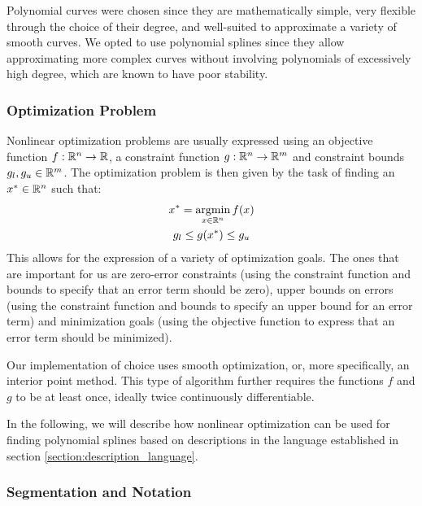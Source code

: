 \documentclass[a4paper]{article}
\begin{document}
			Polynomial curves were chosen since they are mathematically simple, very flexible through the choice of their degree, and well-suited to approximate a variety of smooth curves. We opted to use polynomial splines since they allow approximating more complex curves without involving polynomials of excessively high degree, which are known to have poor stability.

			\subsubsection{Optimization Problem}
			\label{section:optimization_problem}

				Nonlinear optimization problems are usually expressed using an objective function \(f : \mathbb{R}^{n} \rightarrow \mathbb{R}\), a constraint function \(g : \mathbb{R}^{n} \rightarrow \mathbb{R}^{m}\) and constraint bounds \(g_l, g_u \in \mathbb{R}^{m}\). The optimization problem is then given by the task of finding an \(x^* \in \mathbb{R}^{n}\) such that:
				\begin{equation*}
					\begin{gathered}
						x^* = \operatorname*{argmin}_{x \in \mathbb{R}^{n}} f\!\left( x \right)\\
						g_l \leq g\!\left( x^* \right) \leq g_u
					\end{gathered}
				\end{equation*}
				This allows for the expression of a variety of optimization goals. The ones that are important for us are zero-error constraints (using the constraint function and bounds to specify that an error term should be zero), upper bounds on errors (using the constraint function and bounds to specify an upper bound for an error term) and minimization goals (using the objective function to express that an error term should be minimized).

				Our implementation of choice uses smooth optimization, or, more specifically, an interior point method. This type of algorithm further requires the functions \(f\) and \(g\) to be at least once, ideally twice continuously differentiable.

				In the following, we will describe how nonlinear optimization can be used for finding polynomial splines based on descriptions in the language established in section \ref{section:description_language}.

			\subsubsection{Segmentation and Notation}
			\label{section:segmentation_notation}
\end{document}
